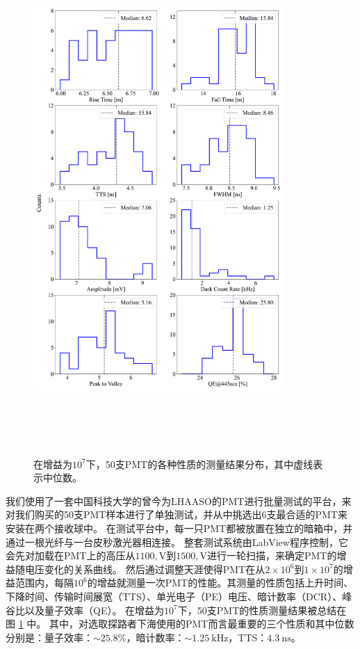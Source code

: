 \begin{figure}[!htb]
    \centering
    \includegraphics[width=0.85\textwidth, height=195mm]{img/pmt_ustc_test_result.pdf}
    \caption{在增益为$10^7$下，50支PMT的各种性质的测量结果分布，其中虚线表示中位数。}
    \label{fig:ustc_pmt}
\end{figure}

我们使用了一套中国科技大学的曾今为LHAASO的PMT进行批量测试的平台\cite{PMT_test:2020}，来对我们购买的50支PMT样本进行了单独测试，并从中挑选出6支最合适的PMT来安装在两个接收球中。
在测试平台中，每一只PMT都被放置在独立的暗箱中，并通过一根光纤与一台皮秒激光器相连接。
整套测试系统由LabView程序控制，它会先对加载在PMT上的高压从$1100,\text{V}$到$1500,\text{V}$进行一轮扫描，来确定PMT的增益随电压变化的关系曲线。
然后通过调整天涯使得PMT在从$2\times10^6$到$1\times10^7$的增益范围内，每隔$10^6$的增益就测量一次PMT的性能。其测量的性质包括上升时间、下降时间、传输时间展宽（TTS）、单光电子（PE）电压、暗计数率（DCR）、峰谷比以及量子效率（QE）。
在增益为$10^7$下，50支PMT的性质测量结果被总结在图 \ref{fig:ustc_pmt} 中。
其中，对选取探路者下海使用的PMT而言最重要的三个性质和其中位数分别是：量子效率：$\sim25.8\%$，暗计数率：$\sim1.25~\text{kHz}$，TTS：$4.3~\text{ns}$。

